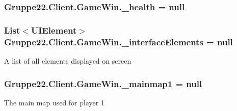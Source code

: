 \hypertarget{class_gruppe22_1_1_client_1_1_game_win_a3d9da6069a5e5c60a810316a78c250a1}{
\subsubsection[{\-\_\-health}]{ Gruppe22.\-Client.\-Game\-Win.\-\_\-health = null\hspace{0.3cm}{\ttfamily [protected]}}}\label{class_gruppe22_1_1_client_1_1_game_win_a3d9da6069a5e5c60a810316a78c250a1}
\hypertarget{class_gruppe22_1_1_client_1_1_game_win_a65c32464243c130b3520ec347ff1659e}{
\subsubsection[{\-\_\-interface\-Elements}]{\setlength{\rightskip}{0pt plus 5cm}List$<${\bf U\-I\-Element}$>$ Gruppe22.\-Client.\-Game\-Win.\-\_\-interface\-Elements = null\hspace{0.3cm}{\ttfamily [protected]}}}\label{class_gruppe22_1_1_client_1_1_game_win_a65c32464243c130b3520ec347ff1659e}


A list of all elements displayed on screen 

\hypertarget{class_gruppe22_1_1_client_1_1_game_win_a8ca9d96b533860c16cfe62f37318c3f4}{
\subsubsection[{\-\_\-mainmap1}]{ Gruppe22.\-Client.\-Game\-Win.\-\_\-mainmap1 = null\hspace{0.3cm}{\ttfamily [protected]}}}\label{class_gruppe22_1_1_client_1_1_game_win_a8ca9d96b533860c16cfe62f37318c3f4}


The main map used for player 1 

